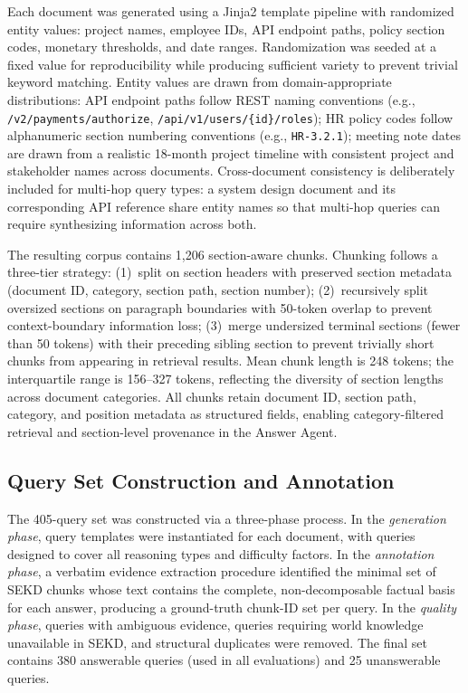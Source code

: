 \documentclass[11pt, a4paper]{article}
\begin{document}
Each document was generated using a Jinja2 template pipeline with randomized entity values: project names, employee IDs, API endpoint paths, policy section codes, monetary thresholds, and date ranges. Randomization was seeded at a fixed value for reproducibility while producing sufficient variety to prevent trivial keyword matching. Entity values are drawn from domain-appropriate distributions: API endpoint paths follow REST naming conventions (e.g., \texttt{/v2/payments/authorize}, \texttt{/api/v1/users/\{id\}/roles}); HR policy codes follow alphanumeric section numbering conventions (e.g., \texttt{HR-3.2.1}); meeting note dates are drawn from a realistic 18-month project timeline with consistent project and stakeholder names across documents. Cross-document consistency is deliberately included for multi-hop query types: a system design document and its corresponding API reference share entity names so that multi-hop queries can require synthesizing information across both.

The resulting corpus contains 1,206 section-aware chunks. Chunking follows a three-tier strategy: (1)~split on section headers with preserved section metadata (document ID, category, section path, section number); (2)~recursively split oversized sections on paragraph boundaries with 50-token overlap to prevent context-boundary information loss; (3)~merge undersized terminal sections (fewer than 50 tokens) with their preceding sibling section to prevent trivially short chunks from appearing in retrieval results. Mean chunk length is 248 tokens; the interquartile range is 156--327 tokens, reflecting the diversity of section lengths across document categories. All chunks retain document ID, section path, category, and position metadata as structured fields, enabling category-filtered retrieval and section-level provenance in the Answer Agent.

\subsection{Query Set Construction and Annotation}

The 405-query set was constructed via a three-phase process. In the \emph{generation phase}, query templates were instantiated for each document, with queries designed to cover all reasoning types and difficulty factors. In the \emph{annotation phase}, a verbatim evidence extraction procedure identified the minimal set of SEKD chunks whose text contains the complete, non-decomposable factual basis for each answer, producing a ground-truth chunk-ID set per query. In the \emph{quality phase}, queries with ambiguous evidence, queries requiring world knowledge unavailable in SEKD, and structural duplicates were removed. The final set contains 380 answerable queries (used in all evaluations) and 25 unanswerable queries.
\end{document}
